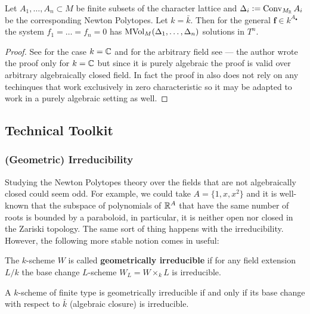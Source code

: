 \begin{theorem}
    Let $A_1, \dots, A_n \subset M$ be finite subsets of the character lattice and $\Delta_i \vcentcolon= \operatorname{Conv}_{M_{\mathbb R}} A_i$ be the corresponding Newton Polytopes. Let $k = \bar k$. Then for the general $\mathbf f \in k^{A_\bullet}$ the system $f_1 = \dots = f_n = 0$ has $\operatorname{MVol}_M(\Delta_1, \dots, \Delta_n)$ solutions in $T^n$.
\end{theorem}
\begin{proof}
    See \cite{bernstein} for the case $k = \mathbb C$ and for the arbitrary field see \cite{Kushnirenko1977} --- the author wrote the proof only for $k = \mathbb C$ but since it is purely algebraic the proof is valid over arbitrary algebraically closed field. In fact the proof in \cite{bernstein} also does not rely on any techinques that work exclusively in zero characteristic so it may be adapted to work in a purely algebraic setting as well.
\end{proof}

\subsection{Technical Toolkit}\label{ssec:prelim_technical}
\subsubsection{(Geometric) Irreducibility}
Studying the Newton Polytopes theory over the fields that are not algebraically closed could seem odd. For example, we could take $A = \{1 , x, x^2\}$ and it is well-known
that the subspace of polynomials of $\mathbb R^A$ that have the same number of roots is bounded by a paraboloid, in particular, it is neither open nor closed in the Zariski topology. The same sort of thing happens with the irreducibility. However, the following more stable notion comes in useful:

\begin{definition}
    The $k$-scheme $W$ is called \textbf{geometrically irreducible} if for any field extension $L/k$ the base change $L$-scheme $W_L = W \times_k L$ is irreducible.
\end{definition}

\begin{remark}
    A $k$-scheme of finite type is geometrically irreducible if and only if its base change with respect to $\bar k$ (algebraic closure) is irreducible.
\end{remark}

